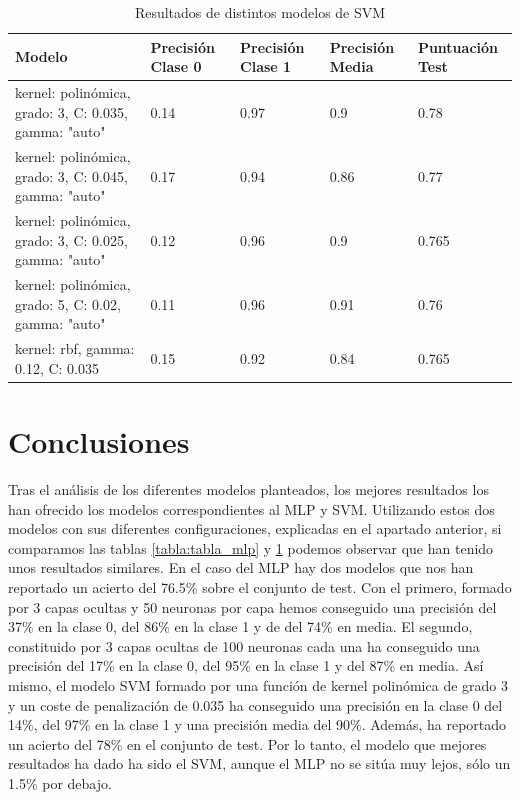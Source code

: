 \documentclass[journal,twoside]{JoPhA}
\begin{document}
\begin{table}[htb!]
	\begin{center}
		\caption{Resultados de distintos modelos de SVM}
		\begin{tabular}{| m{2.1cm} | m{1cm} | m{1cm} | m{1cm} | m{1.2cm} |}
			\hline
			Modelo & Precisión Clase 0 & Precisión Clase 1 & Precisión Media & Puntuación Test   \\ \hline
			kernel: polinómica, grado: 3, C: 0.035, gamma: "auto" & 0.14                & 0.97                & 0.9              & 0.78  \\ \hline
			kernel: polinómica, grado: 3, C: 0.045, gamma: "auto" & 0.17                & 0.94               & 0.86             & 0.77  \\ \hline
			kernel: polinómica, grado: 3, C: 0.025, gamma: "auto" & 0.12 & 0.96 & 0.9 & 0.765 \\ \hline
			kernel: polinómica, grado: 5, C: 0.02, gamma: "auto" & 0.11 & 0.96 & 0.91 & 0.76    \\ \hline
			kernel: rbf, gamma: 0.12, C: 0.035 & 0.15 & 0.92 & 0.84 & 0.765 \\ \hline
			
		\end{tabular}
		
		\label{tabla:tabla_svm}
	\end{center}
\end{table}


\section{Conclusiones}
Tras el análisis de los diferentes modelos planteados, los mejores resultados los han ofrecido los modelos correspondientes al MLP y SVM. Utilizando estos dos modelos con sus diferentes configuraciones, explicadas en el apartado anterior, si comparamos las tablas \ref{tabla:tabla_mlp} y \ref{tabla:tabla_svm} podemos observar que han tenido unos resultados similares. En el caso del MLP hay dos modelos que nos han reportado un acierto del 76.5\% sobre el conjunto de test. Con el primero, formado por 3 capas ocultas y 50 neuronas por capa hemos conseguido una precisión del 37\% en la clase 0, del 86\% en la clase 1 y de del 74\% en media. El segundo, constituido por 3 capas ocultas de 100 neuronas cada una ha conseguido una precisión del 17\% en la clase 0, del 95\% en la clase 1 y del 87\% en media. Así mismo, el modelo SVM formado por una función de kernel polinómica de grado 3 y un coste de penalización de 0.035 ha conseguido una precisión en la clase 0 del 14\%, del 97\% en la clase 1 y una precisión media del 90\%. Además, ha reportado un acierto del 78\% en el conjunto de test. Por lo tanto, el modelo que mejores resultados ha dado ha sido el SVM, aunque el MLP no se sitúa muy lejos, sólo un 1.5\% por debajo.\\
\end{document}
